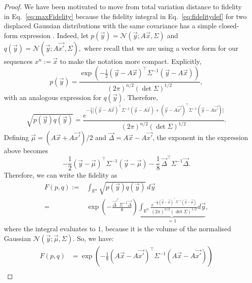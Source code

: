 \documentclass[10pt,conference]{IEEEtran}
\newcommand{\1}{\mathds{1}}
\newcommand{\RR}{\mathbb{R}}
\newcommand{\cN}{\mathcal{N}}
\begin{document}
\begin{proof}
We have been motivated to move from total variation distance to fidelity in Eq.~\eqref{eq:maxFidelity} because the fidelity integral in Eq.~\eqref{eq:fidelitydef} for two displaced Gaussian distributions with the same covariance has a simple closed-form expression \cite{LieseVajda}. Indeed, let
\(
  p(\vec{y})=\mathcal N(\vec{y};A\vec{x},\Sigma)
\)
and
\(
  q(\vec{y})=\mathcal N(\vec{y};A\vec{x'},\Sigma),
\)
where recall that we are using a vector form for our sequences $x^n:=\vec{x}$ to make the notation more compact. Explicitly,
\begin{equation}
  \label{eq:MultiModalNormal}
  p(\vec{y})
    =\frac{\exp\!\left(-\frac12 (\vec{y}-A\vec{x})^\top\Sigma^{-1}(\vec{y}-A\vec{x})\right)}{(2\pi)^{n/2}(\det\Sigma)^{1/2}},
\end{equation}
with an analogous expression for $q(\vec{y})$. Therefore,
\begin{equation*}
  \label{eq:integrant}
  \sqrt{p(\vec{y})q(\vec{y})}
  \!=\! \frac{e^{-\frac14\big[(\vec{y}-A\vec{x})^\top\Sigma^{-1}(\vec{y}-A\vec{x})+(\vec{y}-A\vec{x'})^\top\Sigma^{-1}(\vec{y}-A\vec{x'})\big]}}{(2\pi)^{n/2}(\det\Sigma)^{1/2}}.
\end{equation*}
Defining $\vec{\mu}=(A\vec{x}+A\vec{x'})/2$ and $\vec{\Delta}=A\vec{x}-A\vec{x'}$, the exponent in the expression above becomes
\begin{equation}\label{eq:integrand_exponent}
-\frac12(\vec{y}-\vec{\mu})^\top\Sigma^{-1}(\vec{y}-\vec{\mu})-\frac18\,\vec{\Delta}^\top\Sigma^{-1}\vec{\Delta}.    
\end{equation}
Therefore, we can write the fidelity as
\begin{equation*}
\label{eq:fidelitycalc}
\begin{split}
  F(p,q) 
   :=& \int_{\RR^n}\sqrt{p(\vec{y})q(\vec{y})}\,d\vec{y}\\
    =& \exp\left(-\frac{\vec{\Delta}^\top\Sigma^{-1}\vec{\Delta}}{8}\right)\underbrace{\int_{\RR^n}\frac{e^{-\frac12 (\vec{y}-\vec{\mu})^\top\Sigma^{-1}(\vec{y}-\vec{\mu})}} {(2\pi)^{n/2}(\det\Sigma)^{1/2}}d\vec{y}}_{=1},
\end{split}
\end{equation*}
where the integral evaluates to $1$, because it is the volume of the normalised Gaussian $\cN(\vec{y};\vec{\mu},\Sigma)$. So, we have:
\begin{equation*}
\label{eq:fidelity_step}
\begin{split}
    F(p,q)&=\exp\!\left(-\frac{1}{8}(A\vec{x}-A\vec{x'})^\top\Sigma^{-1}(A\vec{x}-A\vec{x'})\right)\\

\end{split}
\end{equation*}
\end{proof}
\end{document}
